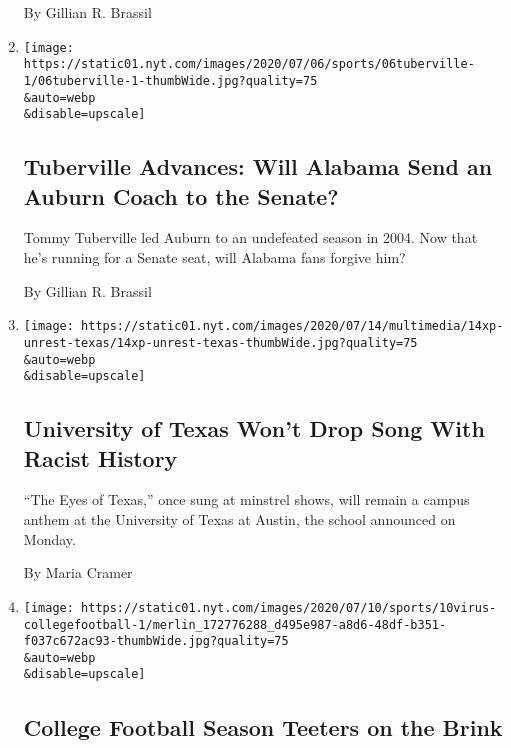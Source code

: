 \begin{enumerate}
  By Gillian R. Brassil
\item
  \href{/2020/07/15/sports/tommy-tuberville-alabama-auburn.html}{}

  \texttt{[image: https://static01.nyt.com/images/2020/07/06/sports/06tuberville-1/06tuberville-1-thumbWide.jpg?quality=75\\\&auto=webp\\\&disable=upscale]}

  \hypertarget{tuberville-advances-will-alabama-send-an-auburn-coach-to-the-senate}{%
  \subsection{Tuberville Advances: Will Alabama Send an Auburn Coach to
  the
  Senate?}\label{tuberville-advances-will-alabama-send-an-auburn-coach-to-the-senate}}

  Tommy Tuberville led Auburn to an undefeated season in 2004. Now that
  he's running for a Senate seat, will Alabama fans forgive him?

  By Gillian R. Brassil
\item
  \href{/2020/07/14/us/eyes-of-texas-football.html}{}

  \texttt{[image: https://static01.nyt.com/images/2020/07/14/multimedia/14xp-unrest-texas/14xp-unrest-texas-thumbWide.jpg?quality=75\\\&auto=webp\\\&disable=upscale]}

  \hypertarget{university-of-texas-wont-drop-song-with-racist-history}{%
  \subsection{University of Texas Won't Drop Song With Racist
  History}\label{university-of-texas-wont-drop-song-with-racist-history}}

  ``The Eyes of Texas,'' once sung at minstrel shows, will remain a
  campus anthem at the University of Texas at Austin, the school
  announced on Monday.

  By Maria Cramer
\item
  \href{/2020/07/10/sports/ncaafootball/coronavirus-college-football-season-canceled.html}{}

  \texttt{[image: https://static01.nyt.com/images/2020/07/10/sports/10virus-collegefootball-1/merlin\_172776288\_d495e987-a8d6-48df-b351-f037c672ac93-thumbWide.jpg?quality=75\\\&auto=webp\\\&disable=upscale]}

  \hypertarget{college-football-season-teeters-on-the-brink}{%
  \subsection{College Football Season Teeters on the
  Brink}\label{college-football-season-teeters-on-the-brink}}


\end{enumerate}
